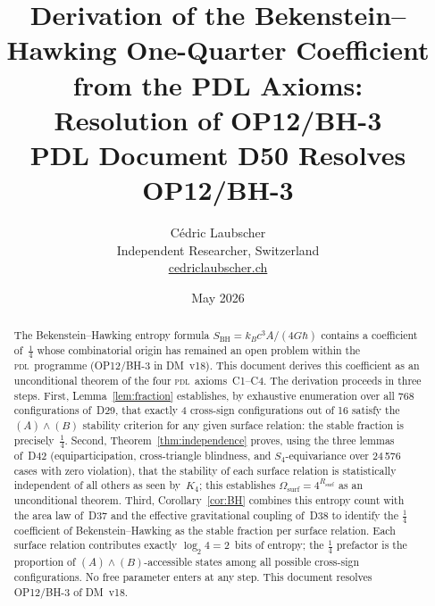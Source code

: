 \documentclass[12pt,a4paper]{article}
\newcommand{\Kfour}{K_4}
\newcommand{\PDL}{\textsc{pdl}}
\newcommand{\Rsurf}{R_{\mathrm{surf}}}
\newcommand{\Omegasurf}{\Omega_{\mathrm{surf}}}
\newcommand{\SBH}{S_{\mathrm{BH}}}
\begin{document}
\title{\textbf{Derivation of the Bekenstein--Hawking One-Quarter Coefficient
from the PDL Axioms:\\
Resolution of OP12/BH-3}\\[6pt]
{\large PDL Document D50 \textemdash{} Resolves OP12/BH-3}}

\author{C\'edric Laubscher\\[4pt]
\small Independent Researcher, Switzerland\\
\small \href{https://cedriclaubscher.ch}{cedriclaubscher.ch}}

\date{May 2026}

\maketitle

\begin{abstract}
The Bekenstein--Hawking entropy formula $\SBH = k_B c^3 A/(4G\hbar)$ contains a coefficient of~$\tfrac{1}{4}$ whose combinatorial origin has remained an open problem within the \PDL\ programme (OP12/BH-3 in DM~v18). This document derives this coefficient as an unconditional theorem of the four \PDL\ axioms~C1--C4. The derivation proceeds in three steps. First, Lemma~\ref{lem:fraction} establishes, by exhaustive enumeration over all 768 configurations of~D29, that exactly 4 cross-sign configurations out of 16 satisfy the $(A)\wedge(B)$ stability criterion for any given surface relation: the stable fraction is precisely~$\tfrac{1}{4}$. Second, Theorem~\ref{thm:independence} proves, using the three lemmas of~D42 (equiparticipation, cross-triangle blindness, and $S_4$-equivariance over 24\,576 cases with zero violation), that the stability of each surface relation is statistically independent of all others as seen by~$\Kfour$; this establishes $\Omegasurf = 4^{\Rsurf}$ as an unconditional theorem. Third, Corollary~\ref{cor:BH} combines this entropy count with the area law of~D37 and the effective gravitational coupling of~D38 to identify the $\tfrac{1}{4}$ coefficient of Bekenstein--Hawking as the stable fraction per surface relation. Each surface relation contributes exactly $\log_2 4 = 2$~bits of entropy; the $\tfrac{1}{4}$ prefactor is the proportion of $(A)\wedge(B)$-accessible states among all possible cross-sign configurations. No free parameter enters at any step. This document resolves OP12/BH-3 of DM~v18.
\end{abstract}

\clearpage
\end{document}
